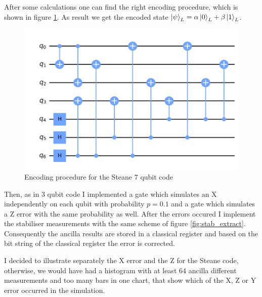 After some calculations one can find the right encoding procedure, which is shown in figure \ref{fig:Steane_enc}. As result we get the encoded state $\ket{\psi}_L = \alpha \ket{0}_L + \beta \ket{1}_L$.%
\begin{figure}[h!]
    \centering
    \includegraphics[scale=0.5]{Mainmatter/images/Encoding_Seven.png}
    \caption{Encoding procedure for the Steane 7 qubit code}
    \label{fig:Steane_enc}
\end{figure}


Then, as in 3 qubit code I implemented a gate which simulates an X independently on each qubit with probability $p=0.1$ and a gate which simulates a Z error with the same probability as well. 
After the errors occured I implement the stabiliser measurements with the same scheme of figure \ref{fig:stab_extract}. Consequently the ancilla results are stored in a classical register and based on the bit string of the classical register the error is corrected.

I decided to illustrate separately the X error and the Z for the Steane code, otherwise, we would have had a histogram with at least 64 ancilla different measurements and too many bars in one chart, that show which of the X, Z or Y error occurred in the simulation.

